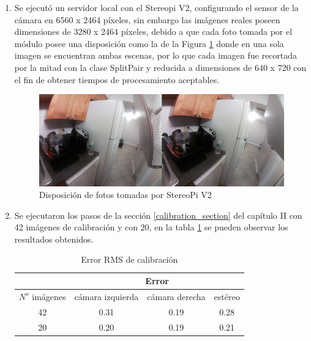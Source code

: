\begin{enumerate}
    \item Se ejecutó un servidor local con el Stereopi V2, configurando el sensor de la cámara en 6560 x 2464 píxeles, sin embargo las imágenes reales poseen dimensiones de 3280 x 2464 píxeles, debido a que cada foto tomada por el módulo posee una disposición como la de la Figura \ref{side-by-side} donde en una sola imagen se encuentran ambas escenas, por lo que cada imagen fue recortada por la mitad con la clase SplitPair y reducida a dimensiones de 640 x 720 con el fin de obtener tiempos de procesamiento aceptables.
    \begin{figure}[H]
    \centering
    \includegraphics[scale=0.5]{Recursos/side_by_side.png}
    \caption{Disposición de fotos tomadas por StereoPi V2}
    \label{side-by-side}
    \end{figure}
    \item Se ejecutaron los pasos de la sección \ref{calibration_section} del capítulo II con 42 imágenes de calibración y con 20, en la tabla \ref{calibration_results} se pueden observar los resultados obtenidos.
    \begin{table}[H]
    \centering
    \caption{Error RMS de calibración}
    \label{calibration_results}
    \begin{tabular}{c|ccc|}
    \cline{2-4}
    \multicolumn{1}{l|}{}                & \multicolumn{3}{c|}{Error}                                                            \\ \hline
    \multicolumn{1}{|c|}{$N^o$ imágenes} & \multicolumn{1}{c|}{cámara izquierda} & \multicolumn{1}{c|}{cámara derecha} & estéreo \\ \hline
    \multicolumn{1}{|c|}{42}             & \multicolumn{1}{c|}{0.31}             & \multicolumn{1}{c|}{0.19}           & 0.28    \\ \hline
    \multicolumn{1}{|c|}{20}             & \multicolumn{1}{c|}{0.20}             & \multicolumn{1}{c|}{0.19}           & 0.21    \\ \hline
    \end{tabular}
    \end{table}
\end{enumerate}
